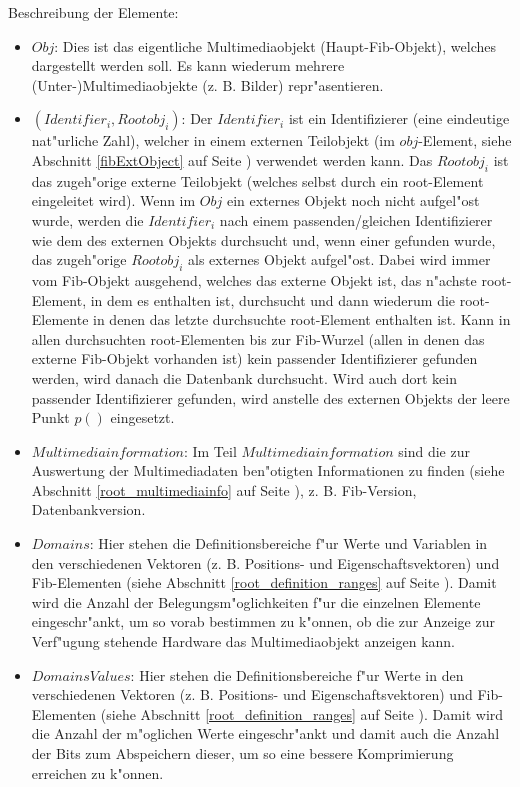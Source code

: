 \bigskip\noindent
Beschreibung der Elemente:
\begin{itemize}
 \item $Obj$: Dies ist das eigentliche Multimediaobjekt (Haupt-Fib-Objekt), welches dargestellt werden soll. Es kann wiederum mehrere (Unter-)Multimediaobjekte (z. B. Bilder) repr"asentieren.
 \item $(Identifier_i, Rootobj_i)$: Der $Identifier_i$ ist ein Identifizierer (eine eindeutige nat"urliche Zahl), welcher in einem externen Teilobjekt (im $obj$-Element, siehe Abschnitt \ref{fibExtObject} auf Seite \pageref{fibExtObject}) verwendet werden kann. Das $Rootobj_i$ ist das zugeh"orige externe Teilobjekt (welches selbst durch ein root-Element eingeleitet wird). Wenn im $Obj$ ein externes Objekt noch nicht aufgel"ost wurde, werden die $Identifier_i$ nach einem passenden/gleichen Identifizierer wie dem des externen Objekts durchsucht und, wenn einer gefunden wurde, das zugeh"orige $Rootobj_i$ als externes Objekt aufgel"ost. Dabei wird immer vom Fib-Objekt ausgehend, welches das externe Objekt ist, das n"achste root-Element, in dem es enthalten ist, durchsucht und dann wiederum die root-Elemente in denen das letzte durchsuchte root-Element enthalten ist. Kann in allen durchsuchten root-Elementen bis zur Fib-Wurzel (allen in denen das externe Fib-Objekt vorhanden ist) kein passender Identifizierer gefunden werden, wird danach die Datenbank durchsucht. Wird auch dort kein passender Identifizierer gefunden, wird anstelle des externen Objekts der leere Punkt $p()$ eingesetzt.
 \item $Multimediainformation$: Im Teil $Multimediainformation$ sind die zur Auswertung der Multimediadaten ben"otigten Informationen zu finden (siehe Abschnitt \ref{root_multimediainfo} auf Seite \pageref{root_multimediainfo}), z. B. Fib-Version, Datenbankversion.
 \item $Domains$: Hier stehen die Definitionsbereiche f"ur Werte und Variablen in den verschiedenen Vektoren (z. B. Positions- und Eigenschaftsvektoren) und Fib-Elementen (siehe Abschnitt \ref{root_definition_ranges} auf Seite \pageref{root_definition_ranges}). Damit wird die Anzahl der Belegungsm"oglichkeiten f"ur die einzelnen Elemente eingeschr"ankt, um so vorab bestimmen zu k"onnen, ob die zur Anzeige zur Verf"ugung stehende Hardware das Multimediaobjekt anzeigen kann.
 \item $DomainsValues$: Hier stehen die Definitionsbereiche f"ur Werte in den verschiedenen Vektoren (z. B. Positions- und Eigenschaftsvektoren) und Fib-Elementen (siehe Abschnitt \ref{root_definition_ranges} auf Seite \pageref{root_definition_ranges}). Damit wird die Anzahl der m"oglichen Werte eingeschr"ankt und damit auch die Anzahl der Bits zum Abspeichern dieser, um so eine bessere Komprimierung erreichen zu k"onnen.

\end{itemize}
